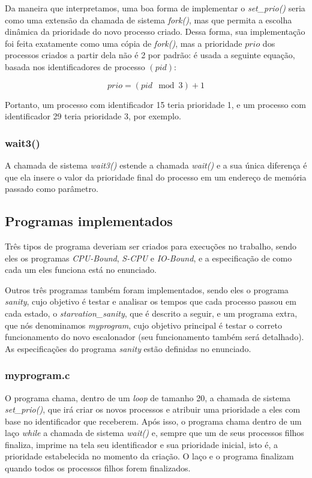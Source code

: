 \documentclass{article}
\begin{document}
Da maneira que interpretamos, uma boa forma de implementar o
\textit{set\_prio()} seria como uma extensão da chamada de sistema
\textit{fork()}, mas que permita a escolha dinâmica da prioridade do novo
processo criado. Dessa forma, sua implementação foi feita exatamente como uma
cópia de \textit{fork()}, mas a prioridade \(prio\) dos processos criados a
partir dela
não é 2 por padrão: é usada a seguinte equação, basada nos identificadores de processo \((pid)\):

\[prio = (pid \mod 3) + 1\]

Portanto, um processo com identificador 15 teria prioridade 1, e um processo
com identificador 29 teria prioridade 3, por exemplo.

\subsubsection{wait3()}

A chamada de sistema \textit{wait3()} estende a chamada \textit{wait()} e a sua
única diferença é que ela insere o valor da prioridade final do processo em
um endereço de memória passado como parâmetro.

\subsection{Programas implementados}

Três tipos de programa deveriam ser criados para execuções no trabalho, sendo
eles
os programas \textit{CPU-Bound}, \textit{S-CPU} e \textit{IO-Bound}, e a
especificação de como cada um eles funciona está no enunciado.

Outros três programas também foram implementados, sendo eles o programa
\textit{sanity}, cujo objetivo é testar e analisar os tempos que cada processo
passou em cada estado, o \textit{starvation\_sanity}, que é descrito a seguir, e
um programa extra, que nós denominamos \textit{myprogram}, cujo objetivo
principal é testar o correto funcionamento do novo escalonador (seu
funcionamento também será detalhado). As especificações do programa
\textit{sanity} estão definidas no enunciado.

\subsubsection{myprogram.c}

O programa chama, dentro de um \textit{loop} de tamanho 20, a chamada de
sistema \textit{set\_prio()}, que irá criar os novos processos e atribuir uma
prioridade a eles com base no identificador que receberem.
Após isso, o programa chama dentro de um laço \textit{while} a chamada de
sistema \textit{wait()} e, sempre que um de seus processos filhos finaliza,
imprime na tela seu identificador e sua prioridade inicial, isto é, a prioridade
estabelecida no momento da criação.
O laço e o programa finalizam quando todos os processos filhos forem
finalizados.
\end{document}
